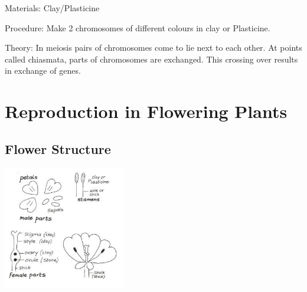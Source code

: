 \begin{multicols}{2}
\begin{description*}
\item[Materials:]{Clay/Plasticine}
\item[Procedure:]{Make 2 chromosomes of different
colours in clay or Plasticine. }
\item[Theory:]{In
meiosis pairs of chromosomes
come to lie next to each other. At
points called chiasmata, parts of
chromosomes are exchanged. This
crossing over results in exchange
of genes.}
\end{description*}


\section*{Reproduction in Flowering Plants}


\subsection{Flower Structure} %

\begin{center}
\includegraphics[width=0.4\textwidth]{./img/vso/flower-structure.jpg}
\end{center}


\end{multicols}

